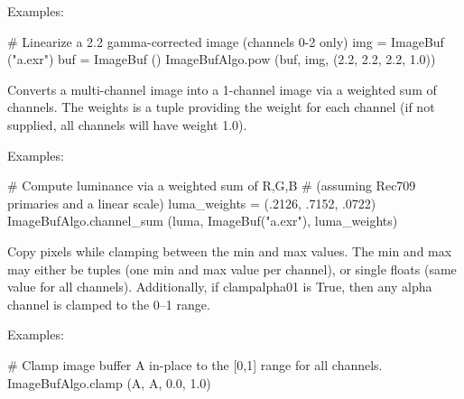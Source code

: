\smallskip
\noindent Examples:
\begin{code}
    # Linearize a 2.2 gamma-corrected image (channels 0-2 only)
    img = ImageBuf ("a.exr")
    buf = ImageBuf ()
    ImageBufAlgo.pow (buf, img, (2.2, 2.2, 2.2, 1.0))
\end{code}
\apiend


 
Converts a multi-channel image into a 1-channel image via a weighted sum
of channels. The {\cf weights} is a tuple providing the weight for each 
channel (if not supplied, all channels will have weight 1.0).

\smallskip
\noindent Examples:
\begin{code}
    # Compute luminance via a weighted sum of R,G,B
    # (assuming Rec709 primaries and a linear scale)
    luma_weights = (.2126, .7152, .0722)
    ImageBufAlgo.channel_sum (luma, ImageBuf("a.exr"), luma_weights)
\end{code}
\apiend


 

Copy pixels while clamping
between the {\cf min} and {\cf max} values.  The {\cf min} and {\cf max}
may either be tuples (one min and max value per channel), or single
{\cf floats} (same value for all channels).  Additionally, if
{\cf clampalpha01} is {\cf True}, then any alpha 
channel is clamped to the 0--1 range.

\smallskip
\noindent Examples:
\begin{code}
    # Clamp image buffer A in-place to the [0,1] range for all channels.
    ImageBufAlgo.clamp (A, A, 0.0, 1.0)
\end{code}
\apiend


 
 

